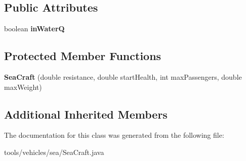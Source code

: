 \subsection*{Public Attributes}
\begin{DoxyCompactItemize}
\item 
boolean {\bfseries in\+WaterQ}\hypertarget{classtools_1_1vehicles_1_1sea_1_1_sea_craft_a9c8c339375deff56e6798e4da2107daf}{}\label{classtools_1_1vehicles_1_1sea_1_1_sea_craft_a9c8c339375deff56e6798e4da2107daf}

\end{DoxyCompactItemize}
\subsection*{Protected Member Functions}
\begin{DoxyCompactItemize}
\item 
{\bfseries Sea\+Craft} (double resistance, double start\+Health, int max\+Passengers, double max\+Weight)\hypertarget{classtools_1_1vehicles_1_1sea_1_1_sea_craft_a7981c062da1256a2bd4615b0d53b0467}{}\label{classtools_1_1vehicles_1_1sea_1_1_sea_craft_a7981c062da1256a2bd4615b0d53b0467}

\end{DoxyCompactItemize}
\subsection*{Additional Inherited Members}


The documentation for this class was generated from the following file\+:\begin{DoxyCompactItemize}
\item 
tools/vehicles/sea/Sea\+Craft.\+java\end{DoxyCompactItemize}
